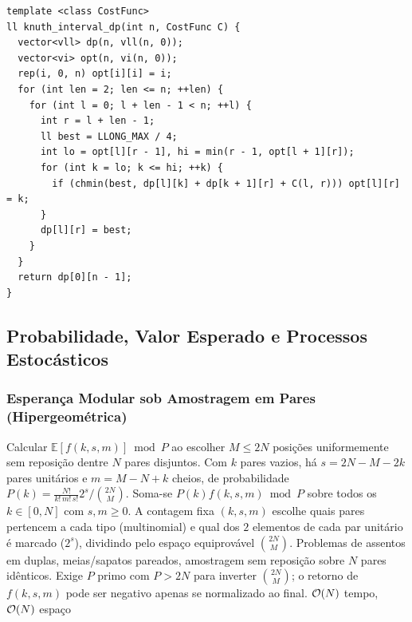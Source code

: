 \begin{lstlisting}
template <class CostFunc>
ll knuth_interval_dp(int n, CostFunc C) {
  vector<vll> dp(n, vll(n, 0));
  vector<vi> opt(n, vi(n, 0));
  rep(i, 0, n) opt[i][i] = i;
  for (int len = 2; len <= n; ++len) {
    for (int l = 0; l + len - 1 < n; ++l) {
      int r = l + len - 1;
      ll best = LLONG_MAX / 4;
      int lo = opt[l][r - 1], hi = min(r - 1, opt[l + 1][r]);
      for (int k = lo; k <= hi; ++k) {
        if (chmin(best, dp[l][k] + dp[k + 1][r] + C(l, r))) opt[l][r] = k;
      }
      dp[l][r] = best;
    }
  }
  return dp[0][n - 1];
}
\end{lstlisting}

\subsection{Probabilidade, Valor Esperado e Processos Estocásticos}

\subsubsection{Esperança Modular sob Amostragem em Pares (Hipergeométrica)}
\algobox
  {Calcular $\mathbb{E}[f(k, s, m)] \bmod P$ ao escolher $M \le 2N$ posições uniformemente sem reposição dentre $N$ pares disjuntos.}
  {Com $k$ pares vazios, há $s = 2N - M - 2k$ pares unitários e $m = M - N + k$ cheios, de probabilidade $P(k) = \frac{N!}{k!\, m!\, s!} 2^s \big/ \binom{2N}{M}$. Soma-se $P(k) f(k, s, m) \bmod P$ sobre todos os $k \in [0, N]$ com $s, m \ge 0$.}
  {A contagem fixa $(k, s, m)$ escolhe quais pares pertencem a cada tipo (multinomial) e qual dos $2$ elementos de cada par unitário é marcado ($2^s$), dividindo pelo espaço equiprovável $\binom{2N}{M}$.}
  {Problemas de assentos em duplas, meias/sapatos pareados, amostragem sem reposição sobre $N$ pares idênticos.}
  {Exige $P$ primo com $P > 2N$ para inverter $\binom{2N}{M}$; o retorno de $f(k, s, m)$ pode ser negativo apenas se normalizado ao final.}
  {$\mathcal{O}(N)$ tempo, $\mathcal{O}(N)$ espaço}

